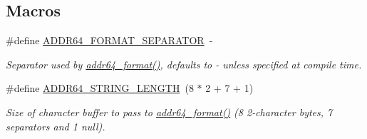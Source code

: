 \subsection*{Macros}
\begin{DoxyCompactItemize}
\item 
\#define \hyperlink{group__wpan__types_ga806a2554dd5d8a154d23b13b9cf72141}{A\+D\+D\+R64\+\_\+\+F\+O\+R\+M\+A\+T\+\_\+\+S\+E\+P\+A\+R\+A\+T\+OR}~\textquotesingle{}-\/\textquotesingle{}
\begin{DoxyCompactList}\small\item\em Separator used by \hyperlink{group__wpan__types_ga448782f4aed0821758969b47221417ed}{addr64\+\_\+format()}, defaults to \textquotesingle{}-\/\textquotesingle{} unless specified at compile time. \end{DoxyCompactList}\item 
\#define \hyperlink{group__wpan__types_gac468b40b060897498f923923654c3d4a}{A\+D\+D\+R64\+\_\+\+S\+T\+R\+I\+N\+G\+\_\+\+L\+E\+N\+G\+TH}~(8 $\ast$ 2 + 7 + 1)
\begin{DoxyCompactList}\small\item\em Size of character buffer to pass to \hyperlink{group__wpan__types_ga448782f4aed0821758969b47221417ed}{addr64\+\_\+format()} (8 2-\/character bytes, 7 separators and 1 null). \end{DoxyCompactList}\end{DoxyCompactItemize}
